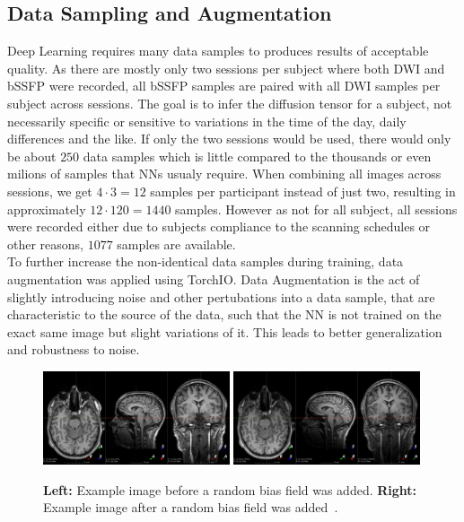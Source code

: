 \subsection{Data Sampling and Augmentation}
Deep Learning requires many data samples to produces results of acceptable quality.
As there are mostly only two sessions per subject where both DWI and bSSFP were recorded, all bSSFP samples are paired with all DWI samples per subject across sessions.
The goal is to infer the diffusion tensor for a subject, not necessarily specific or sensitive to variations in the time of the day, daily differences and the like.
If only the two sessions would be used, there would only be about $250$ data samples which is little compared to the thousands or even milions of samples that NNs usualy require.
When combining all images across sessions, we get $4 \cdot 3 = 12$ samples per participant instead of just two, resulting in approximately $12 \cdot 120 = 1440$ samples.
However as not for all subject, all sessions were recorded either due to subjects compliance to the scanning schedules or other reasons, $1077$ samples are available. \\

To further increase the non-identical data samples during training, data augmentation was applied using TorchIO.
Data Augmentation is the act of slightly introducing noise and other pertubations into a data sample, that are characteristic to the source of the data, such that the NN is not trained on the exact same image but slight variations of it.
This leads to better generalization and robustness to noise.

\begin{figure}[h]
   \begin{center}
      \includegraphics[keepaspectratio, width=0.49\textwidth]{img/random_bias_field-0.png}
      \includegraphics[keepaspectratio, width=0.49\textwidth]{img/random_bias_field-1.png}
   \end{center}
   \caption{
      \textbf{Left:} Example image before a random bias field was added.
      \textbf{Right:} Example image after a random bias field was added~\autocite{noauthor_augmentation_nodate}.
   }
   \label{bias-field}
\end{figure}

